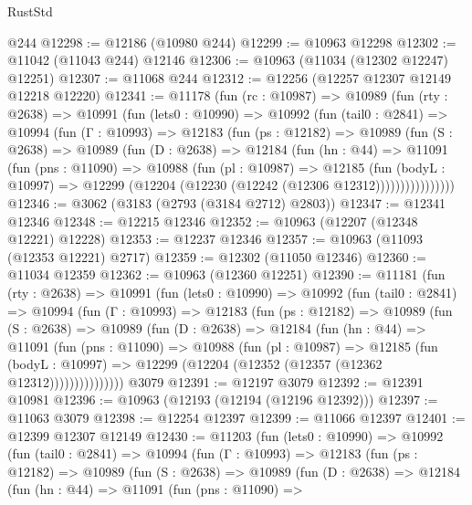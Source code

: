 \begin{lexlean}{RustStd}
\begin{coremodule}
{\begin{coremodule}
{{{{{{{{{{{{{{{{{{{{{{{{{{{{{{{{{    @244
@12298 := @12186 (@10980 @244)
@12299 := @10963 @12298
@12302 := @11042 (@11043 @244) @12146
@12306 := @10963 (@11034 (@12302 @12247) @12251)
@12307 := @11068 @244
@12312 := @12256 (@12257 @12307 @12149 @12218 @12220)
@12341 := @11178
    (fun (rc : @10987) =>
    @10989
      (fun (rty : @2638) =>
      @10991
        (fun (lets0 : @10990) =>
        @10992
          (fun (tail0 : @2841) =>
          @10994
            (fun (Γ : @10993) =>
            @12183
              (fun (ps : @12182) =>
              @10989
                (fun (S : @2638) =>
                @10989
                  (fun (D : @2638) =>
                  @12184
                    (fun (hn : @44) =>
                    @11091
                      (fun (pns : @11090) =>
                      @10988
                        (fun (pl : @10987) =>
                        @12185
                          (fun (bodyL : @10997) =>
                          @12299 (@12204 (@12230 (@12242 (@12306 @12312))))))))))))))))
@12346 := @3062 (@3183 (@2793 (@3184 @2712) @2803))
@12347 := @12341 @12346
@12348 := @12215 @12346
@12352 := @10963 (@12207 (@12348 @12221) @12228)
@12353 := @12237 @12346
@12357 := @10963 (@11093 (@12353 @12221) @2717)
@12359 := @12302 (@11050 @12346)
@12360 := @11034 @12359
@12362 := @10963 (@12360 @12251)
@12390 := @11181
    (fun (rty : @2638) =>
    @10991
      (fun (lets0 : @10990) =>
      @10992
        (fun (tail0 : @2841) =>
        @10994
          (fun (Γ : @10993) =>
          @12183
            (fun (ps : @12182) =>
            @10989
              (fun (S : @2638) =>
              @10989
                (fun (D : @2638) =>
                @12184
                  (fun (hn : @44) =>
                  @11091
                    (fun (pns : @11090) =>
                    @10988
                      (fun (pl : @10987) =>
                      @12185
                        (fun (bodyL : @10997) =>
                        @12299 (@12204 (@12352 (@12357 (@12362 @12312)))))))))))))))
    @3079
@12391 := @12197 @3079
@12392 := @12391 @10981
@12396 := @10963 (@12193 (@12194 (@12196 @12392)))
@12397 := @11063 @3079
@12398 := @12254 @12397
@12399 := @11066 @12397
@12401 := @12399 @12307 @12149
@12430 := @11203
    (fun (lets0 : @10990) =>
    @10992
      (fun (tail0 : @2841) =>
      @10994
        (fun (Γ : @10993) =>
        @12183
          (fun (ps : @12182) =>
          @10989
            (fun (S : @2638) =>
            @10989
              (fun (D : @2638) =>
              @12184
                (fun (hn : @44) =>
                @11091
                  (fun (pns : @11090) =>
}}}}}}}}}}}}}}}}}}}}}}}}}}}}}}}}}
\end{coremodule}}
\end{coremodule}
\end{lexlean}

